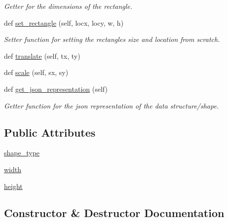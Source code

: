 \begin{DoxyCompactItemize}
\begin{DoxyCompactList}\small\item\em Getter for the dimensions of the rectangle. \end{DoxyCompactList}\item 
def \hyperlink{classbridges_1_1rectangle_1_1_rectangle_a187376dcdc5c10c5b1ce5f3f00a80961}{set\+\_\+rectangle} (self, locx, locy, w, h)
\begin{DoxyCompactList}\small\item\em Setter function for setting the rectangles size and location from scratch. \end{DoxyCompactList}\item 
def \hyperlink{classbridges_1_1rectangle_1_1_rectangle_aa032816d119516e90a4237cd979a5d41}{translate} (self, tx, ty)
\item 
def \hyperlink{classbridges_1_1rectangle_1_1_rectangle_af540e714f768efb6142310047fffc8c7}{scale} (self, sx, sy)
\item 
def \hyperlink{classbridges_1_1rectangle_1_1_rectangle_abed807aa2b797312357395f874577a64}{get\+\_\+json\+\_\+representation} (self)
\begin{DoxyCompactList}\small\item\em Getter function for the json representation of the data structure/shape. \end{DoxyCompactList}\end{DoxyCompactItemize}
\subsection*{Public Attributes}
\begin{DoxyCompactItemize}
\item 
\hyperlink{classbridges_1_1rectangle_1_1_rectangle_acd8a51dab1da86bd859fb47fb7ab1884}{shape\+\_\+type}
\item 
\hyperlink{classbridges_1_1rectangle_1_1_rectangle_ac70360e861fb0dfab5fae8525ffc86ba}{width}
\item 
\hyperlink{classbridges_1_1rectangle_1_1_rectangle_a3b7a2448881d5eea95e86aac8dfae467}{height}
\end{DoxyCompactItemize}


\subsection{Constructor \& Destructor Documentation}
\mbox{\label{classbridges_1_1rectangle_1_1_rectangle_aad5cb2fdd1da2686fb67de2150f55d42}} 
